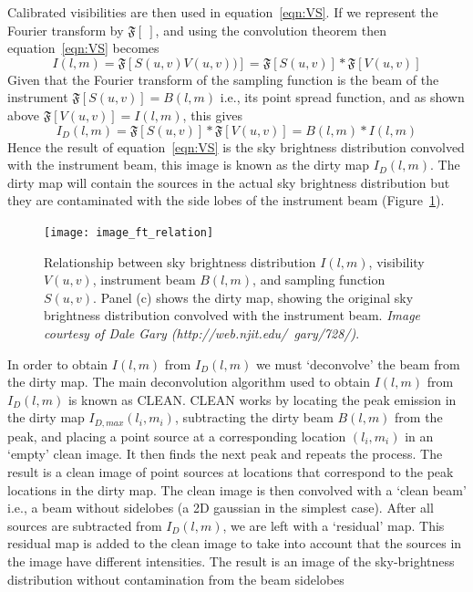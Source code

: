 Calibrated visibilities are then used in equation~\ref{eqn:VS}. If we represent the Fourier transform by $\mathfrak{F}[~]$, and using the convolution theorem then equation~\ref{eqn:VS} becomes
\begin{equation}
I(l,m)=\mathfrak{F}[S(u,v)V(u,v))] = \mathfrak{F}[S(u,v)]\ast\mathfrak{F}[V(u,v)]
\label{eqn:VS2}
\end{equation}
Given that the Fourier transform of the sampling function is the beam of the instrument $\mathfrak{F}[S(u,v)] = B(l,m)$ i.e., its point spread function, and as shown above $\mathfrak{F}[V(u,v)] = I(l,m)$, this gives
\begin{equation}
I_D(l,m) = \mathfrak{F}[S(u,v)]\ast\mathfrak{F}[V(u,v)] = B(l,m) \ast I(l,m)
\label{eqn:convol}
\end{equation}
Hence the result of equation~\ref{eqn:VS} is the sky brightness distribution convolved with the instrument beam, this image is known as the dirty map $I_D(l,m)$. The dirty map will contain the sources in the actual sky brightness distribution but they are contaminated with the side lobes of the instrument beam (Figure~\ref{fig:IVSB}). 
\begin{figure}[!t]
\begin{center}
\texttt{[image: image\_ft\_relation]}
\caption[Sky brightness, visibility, beam, and sampling function]{Relationship between sky brightness distribution $I(l,m)$, visibility $V(u,v)$, instrument beam $B(l,m)$, and sampling function $S(u,v)$. Panel (c) shows the dirty map, showing the original sky brightness distribution convolved with the instrument beam. {\it Image courtesy of Dale Gary (http://web.njit.edu/~gary/728/)}.}
\label{fig:IVSB}
\end{center}
\end{figure}
In order to obtain $I(l,m)$ from $I_D(l,m)$ we must `deconvolve' the beam from the dirty map. The main deconvolution algorithm used to obtain $I(l,m)$ from $I_D(l,m)$ is known as CLEAN. CLEAN works by locating the peak emission in the dirty map $I_{D, max}(l_i,m_i)$, subtracting the dirty beam $B(l,m)$ from the peak, and placing a point source at a corresponding location $(l_i,m_i)$ in an `empty' clean image. It then finds the next peak and repeats the process. The result is a clean image of point sources at locations that correspond to the peak locations in the dirty map. The clean image is then convolved with a `clean beam' i.e., a beam without sidelobes (a 2D gaussian in the simplest case). After all sources are subtracted from $I_D(l,m)$, we are left with a `residual' map. This residual map is added to the clean image to take into account that the sources in the image have different intensities. The result is an image of the sky-brightness distribution without contamination from the beam sidelobes
